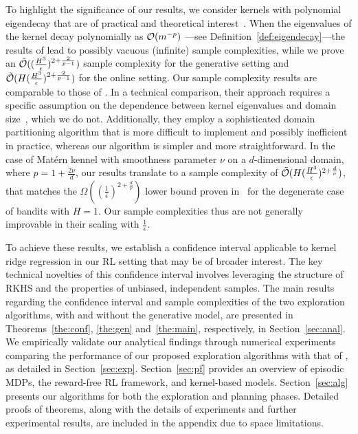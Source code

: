 To highlight the significance of our results, we consider kernels with polynomial eigendecay %
that are of practical and theoretical interest~\citep{srinivas2009gaussian, jacot2018neural, vakili2023information}. When the eigenvalues of the kernel decay polynomially as $\mathcal{O}(m^{-p})$ ---see Definition~\ref{def:eigendecay}---the results of \citet{qiu2021reward} lead to possibly vacuous (infinite) sample complexities, while we prove an $\tilde{\mathcal{O}}((\frac{H^3}{\epsilon})^{2+\frac{2}{p-1}})$ sample complexity for the generative setting and $\tilde{\mathcal{O}}(H(\frac{H^3}{\epsilon})^{2+\frac{2}{p-1}})$ for the online setting. Our sample complexity results are comparable to those of \citet{vakilireward}. In a technical comparison, their approach requires a specific assumption on the dependence between kernel eigenvalues and domain size~\citep[see,][Definition $4.1$]{vakilireward}, which we do not. Additionally, they employ a sophisticated domain partitioning algorithm that is more difficult to implement and possibly inefficient in practice, whereas our algorithm is simpler and more straightforward.
In the case of Mat{\'e}rn kennel with smoothness parameter $\nu$ on a $d$-dimensional domain, where $p=1+\frac{2\nu}{d}$, our results translate to a sample complexity of $\tilde{\mathcal{O}}(H(\frac{H^3}{\epsilon})^{2+\frac{d}{\nu}})$, that matches the $\Omega((\frac{1}{\epsilon})^{2+\frac{d}{\nu}})$ lower bound proven in~\cite{scarlett2017lower} for the degenerate case of bandits with $H=1$. Our sample complexities thus are not generally improvable in their scaling with $\frac{1}{\epsilon}$. 

To achieve these results, we establish a confidence interval applicable to kernel ridge regression in our RL setting that may be of broader interest. The key technical novelties of this confidence interval involves leveraging the structure of RKHS and the properties of unbiased, independent samples. The main results regarding the confidence interval and sample complexities of the two exploration algorithms, with and without the generative model, are presented in Theorems~\ref{the:conf}, \ref{the:gen} and~\ref{the:main}, respectively, in Section~\ref{sec:anal}. We empirically validate our analytical findings through numerical experiments comparing the performance of our proposed exploration algorithms with that of \citet{qiu2021reward}, as detailed in Section~\ref{sec:exp}. Section~\ref{sec:pf} provides an overview of episodic MDPs, the reward-free RL framework, and kernel-based models. Section~\ref{sec:alg} presents our algorithms for both the exploration and planning phases. Detailed proofs of theorems, along with the details of experiments and further experimental results, are included in the appendix due to space limitations.
